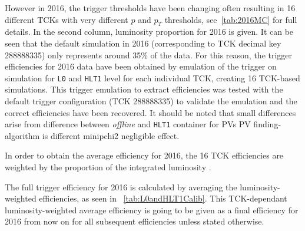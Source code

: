 However in 2016, the trigger thresholds have been changing often resulting in 16 different TCKs with very different $p$ and $p_{T}$ thresholds, see\DIFdelbegin {}\DIFdelend ~\autoref{tab:2016MC} for full details. In the second column, \DIFaddbegin {}\DIFaddend luminosity proportion for 2016 is given. It can be seen that the default simulation in 2016 (corresponding to TCK decimal key 288888335) only represents around 35\% of the data. For this reason, the trigger efficiencies for 2016 data have been obtained by emulation of the trigger on simulation for \texttt{L0} and \texttt{HLT1} level for each individual TCK, creating 16 TCK-based simulations.  This trigger emulation to extract efficiencies was tested with the default trigger configuration (TCK 288888335) to validate the emulation and the correct efficiencies have been recovered. It should be noted that small differences arise from difference between \textit{offline} and \texttt{HLT1} container for \gls{PV}s\DIFdelbegin {}%
\DIFdelend \DIFaddbegin {}\DIFaddend \gls{PV} finding-algorithm is different \DIFdelbegin {}\DIFdelend \DIFaddbegin {}\gls{minipchi2} \DIFaddend negligible effect. %

In order to obtain the average efficiency for 2016, the 16 TCK efficiencies are weighted by the proportion of \DIFdelbegin {}\DIFdelend the integrated luminosity \DIFdelbegin {}\DIFdelend \DIFaddbegin {}\DIFaddend .

The full trigger efficiency for 2016 is calculated by averaging the luminosity-weighted efficiencies, as seen in ~\autoref{tab:L0andHLT1Calib}. This TCK-dependant luminosity-weighted average efficiency is going to be given as a final efficiency for 2016 from now on for all subsequent efficiencies unless stated otherwise.  

